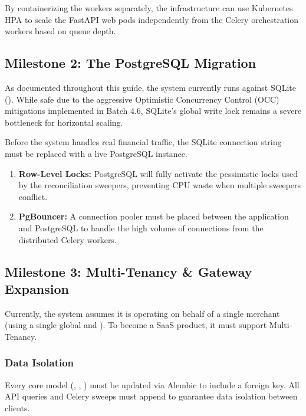 By containerizing the workers separately, the infrastructure can use Kubernetes HPA to scale the FastAPI web pods independently from the Celery orchestration workers based on queue depth.

\vspace{0.8cm}

\subsection{Milestone 2: The PostgreSQL Migration}

As documented throughout this guide, the system currently runs against SQLite (). While safe due to the aggressive Optimistic Concurrency Control (OCC) mitigations implemented in Batch 4.6, SQLite's global write lock remains a severe bottleneck for horizontal scaling.

\begin{tcolorbox}[warningbox={Abandoning SQLite}]
Before the system handles real financial traffic, the SQLite connection string must be replaced with a live PostgreSQL instance.
\begin{enumerate}
    \item \textbf{Row-Level Locks:} PostgreSQL will fully activate the  pessimistic locks used by the reconciliation sweepers, preventing CPU waste when multiple sweepers conflict.
    \item \textbf{PgBouncer:} A connection pooler must be placed between the application and PostgreSQL to handle the high volume of connections from the distributed Celery workers.
\end{enumerate}
\end{tcolorbox}

\vspace{0.8cm}

\subsection{Milestone 3: Multi-Tenancy \& Gateway Expansion}

Currently, the system assumes it is operating on behalf of a single merchant (using a single global  and ). To become a SaaS product, it must support Multi-Tenancy.

\subsubsection{Data Isolation}
Every core model (, , ) must be updated via Alembic to include a  foreign key. All API queries and Celery sweeps must append  to guarantee data isolation between clients.

